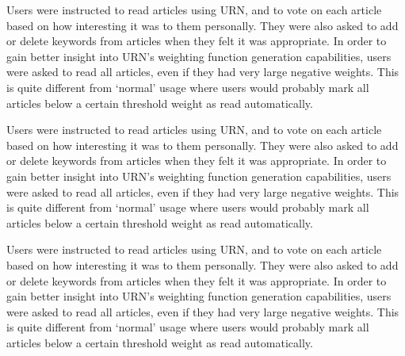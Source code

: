 Users were instructed to read articles using URN, and to vote on each article
based on how interesting it was to them personally. They were also asked to add
or delete keywords from articles when they felt it was appropriate. In order to
gain better insight into URN's weighting function generation capabilities,
users were asked to read all articles, even if they had very large negative
weights. This is quite different from `normal' usage where users
would probably mark all articles below a certain threshold weight as read
automatically.

Users were instructed to read articles using URN, and to vote on each article
based on how interesting it was to them personally. They were also asked to add
or delete keywords from articles when they felt it was appropriate. In order to
gain better insight into URN's weighting function generation capabilities,
users were asked to read all articles, even if they had very large negative
weights. This is quite different from `normal' usage where users
would probably mark all articles below a certain threshold weight as read
automatically.

Users were instructed to read articles using URN, and to vote on each article
based on how interesting it was to them personally. They were also asked to add
or delete keywords from articles when they felt it was appropriate. In order to
gain better insight into URN's weighting function generation capabilities,
users were asked to read all articles, even if they had very large negative
weights. This is quite different from `normal' usage where users
would probably mark all articles below a certain threshold weight as read
automatically.


%



